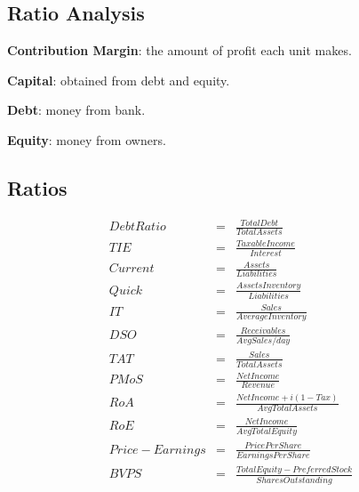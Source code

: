 \documentclass[landscape, letterpaper, 10pt]{article}
\begin{document}
\begin{multicols}{3}
    \section*{Ratio Analysis}

    \textbf{Contribution Margin}: the amount of profit each unit makes.

    \textbf{Capital}: obtained from debt and equity.

    \textbf{Debt}: money from bank.

    \textbf{Equity}: money from owners.

    \subsection*{Ratios}
    \begin{align*}
        DebtRatio      & = & \frac{TotalDebt}{TotalAssets}                          \\
        TIE            & = & \frac{TaxableIncome}{Interest}                         \\
        Current        & = & \frac{Assets}{Liabilities}                             \\
        Quick          & = & \frac{AssetsInventory}{Liabilities}                    \\
        IT             & = & \frac{Sales}{AverageInventory}                         \\
        DSO            & = & \frac{Receivables}{AvgSales/day}                       \\
        TAT            & = & \frac{Sales}{TotalAssets}                              \\
        PMoS           & = & \frac{NetIncome}{Revenue}                              \\
        RoA            & = & \frac{NetIncome + i(1-Tax)}{AvgTotalAssets}            \\
        RoE            & = & \frac{NetIncome}{AvgTotalEquity}                       \\
        Price-Earnings & = & \frac{PricePerShare}{EarningsPerShare}                 \\
        BVPS           & = & \frac{TotalEquity - PreferredStock}{SharesOutstanding} \\
    \end{align*}

\end{multicols}
\end{document}
